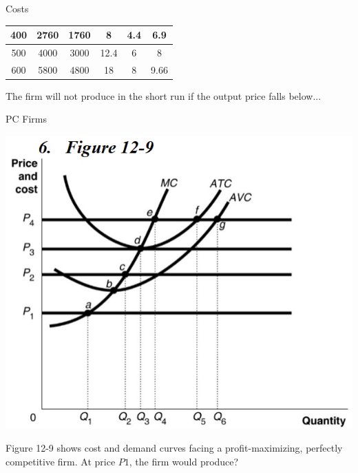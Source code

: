 \documentclass{beamer}
\begin{document}
\begin{frame}[t]{Costs}
\begin{table}[H]
\begin{tabular}{cccccc}
    400      & 2760                                                  & 1760                                                    & 8                                                        & 4.4                                                              & 6.9                                                           \\ \hline
    500      & 4000                                                  & 3000                                                    & 12.4                                                     & 6                                                                & 8                                                             \\ \hline
    600      & 5800                                                  & 4800                                                    & 18                                                       & 8                                                                & 9.66                                                         
    \end{tabular}
    \end{table}
    The firm will not produce in the short run if the output price falls below...
\end{frame}

\begin{frame}[t]{PC Firms}
    \begin{center}
        \includegraphics[scale=.6]{images/graph.png}
    \end{center}
    \newline
    Figure 12-9 shows cost and demand curves facing a profit-maximizing, perfectly competitive firm. At price $P1$, the firm would produce?
\end{frame}
\end{document}
